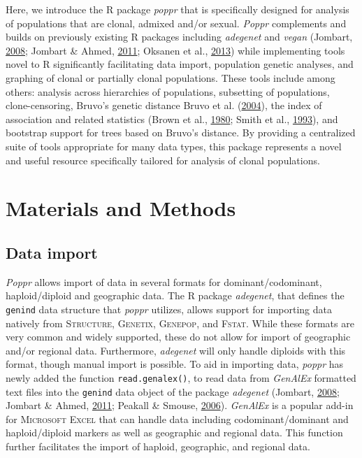 \documentclass[double,11pt]{beavtex}
\begin{document}
  Here, we introduce the R package \emph{poppr} that is specifically
  designed for analysis of populations that are clonal, admixed and/or
  sexual. \emph{Poppr} complements and builds on previously existing R
  packages including \emph{adegenet} and \emph{vegan} (Jombart,
  \protect\hyperlink{ref-Jombart_2008}{2008}; Jombart \& Ahmed,
  \protect\hyperlink{ref-jombart2011adegenet}{2011}; Oksanen et al.,
  \protect\hyperlink{ref-oksanen2013vegan}{2013}) while implementing tools
  novel to R significantly facilitating data import, population genetic
  analyses, and graphing of clonal or partially clonal populations. These
  tools include among others: analysis across hierarchies of populations,
  subsetting of populations, clone-censoring, Bruvo's genetic distance
  Bruvo et al. (\protect\hyperlink{ref-bruvo2004simple}{2004}), the index
  of association and related statistics (Brown et al.,
  \protect\hyperlink{ref-brown1980multilocus}{1980}; Smith et al.,
  \protect\hyperlink{ref-smith1993how}{1993}), and bootstrap support for
  trees based on Bruvo's distance. By providing a centralized suite of
  tools appropriate for many data types, this package represents a novel
  and useful resource specifically tailored for analysis of clonal
  populations.
  
  \section{Materials and Methods}\label{materials-and-methods}
  
  \subsection{Data import}\label{data-import}
  
  \emph{Poppr} allows import of data in several formats for
  dominant/codominant, haploid/diploid and geographic data. The R package
  \emph{adegenet}, that defines the \texttt{genind} data structure that
  \emph{poppr} utilizes, allows support for importing data natively from
  \textsc{Structure, Genetix, Genepop}, and \textsc{Fstat}. While these
  formats are very common and widely supported, these do not allow for
  import of geographic and/or regional data. Furthermore, \emph{adegenet}
  will only handle diploids with this format, though manual import is
  possible. To aid in importing data, \emph{poppr} has newly added the
  function \texttt{read.genalex()}, to read data from \emph{GenAlEx}
  formatted text files into the \texttt{genind} data object of the package
  \emph{adegenet} (Jombart, \protect\hyperlink{ref-Jombart_2008}{2008};
  Jombart \& Ahmed, \protect\hyperlink{ref-jombart2011adegenet}{2011};
  Peakall \& Smouse, \protect\hyperlink{ref-Peakall:2006}{2006}).
  \emph{GenAlEx} is a popular add-in for \textsc{Microsoft Excel} that can
  handle data including codominant/dominant and haploid/diploid markers as
  well as geographic and regional data. This function further facilitates
  the import of haploid, geographic, and regional data.
  
\end{document}
